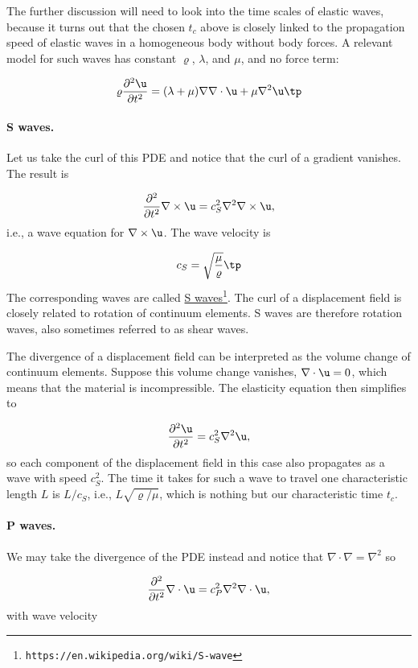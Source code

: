 \documentclass[graybox,envcountchap,sectrefs,final]{svmonodo}
\begin{document}
The further discussion will need to look into the time scales of
elastic waves, because it turns out that the chosen $t_c$ above is
closely linked to the propagation speed of elastic waves in a
homogeneous body without body forces.  A relevant model for
such waves has constant
$\varrho$, $\lambda$, and $\mu$, and no force term:

\begin{equation}
\varrho\frac{\partial^2\u}{\partial t^2} =
(\lambda + \mu)\nabla \nabla\cdot\u + \mu\nabla^2\u\tp
\label{scale:elasticity:waves:eq}
\end{equation}

\paragraph{S waves.}
Let us take the curl of this PDE and notice
that the curl of a  gradient vanishes. The result is

\[\frac{\partial^2}{\partial t^2}\nabla\times\u = c_S^2\nabla^2\nabla\times\u,\]
i.e., a wave equation for $\nabla\times\u$. The wave velocity is

\[ c_S = \sqrt{\frac{\mu}{\varrho}}\tp\]
The corresponding waves are called
\href{{https://en.wikipedia.org/wiki/S-wave}}{S waves}\footnote{\texttt{https://en.wikipedia.org/wiki/S-wave}}. The curl of a
displacement field is closely related to rotation of continuum elements.
S waves are therefore rotation waves, also sometimes referred to as
shear waves.

The divergence of a displacement field can be interpreted as the
volume change of continuum elements. Suppose this volume change vanishes,
$\nabla\cdot\u = 0$, which means that the material is incompressible.
The elasticity equation then simplifies to

\[\frac{\partial^2 \u}{\partial t^2} = c_S^2\nabla^2\u,\]
\label{scale:elasticity:waves:Sweq}
so each component of
the displacement field in this case also propagates as a wave
with speed $c_S^2$.
The time it takes for such a wave to travel one characteristic length
$L$ is $L/c_S$, i.e., $L\sqrt{\varrho/\mu}$, which is nothing but
our characteristic time $t_c$.

\paragraph{P waves.}
We may take the divergence of the PDE instead and notice that $\nabla\cdot\nabla
=\nabla^2$ so

\[\frac{\partial^2}{\partial t^2}\nabla\cdot\u = c_P^2\nabla^2\nabla\cdot\u,\]
with wave velocity
\end{document}

